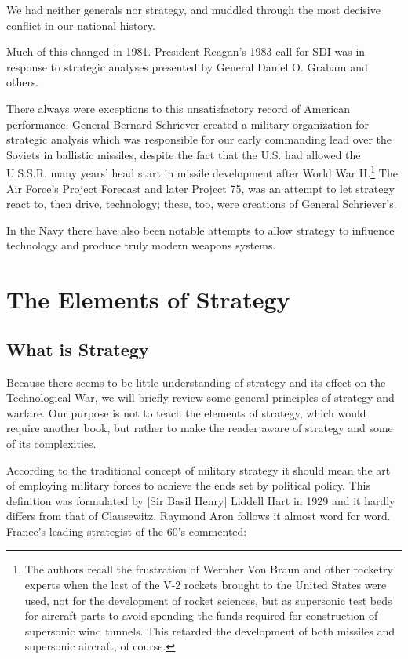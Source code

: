 We had neither generals nor strategy, and muddled through the most decisive conflict in our national history.

Much of this changed in 1981. President Reagan's 1983 call for SDI was in response to strategic analyses presented by General Daniel O. Graham and others.

There always were exceptions to this unsatisfactory record of American performance. General Bernard Schriever created a military organization for strategic analysis which was responsible for our early commanding lead over the Soviets in ballistic missiles, despite the fact that the U.S. had allowed the U.S.S.R. many years' head start in missile development after World War II.\footnote{The authors recall the frustration of Wernher Von Braun and other rocketry experts when the last of the V-2 rockets brought to the United States were used, not for the development of rocket sciences, but as supersonic test beds for aircraft parts to avoid spending the funds required for construction of supersonic wind tunnels. This retarded the development of both missiles and supersonic aircraft, of course.} The Air Force's Project Forecast and later Project 75, was an attempt to let strategy react to, then drive, technology; these, too, were creations of General Schriever's.

In the Navy there have also been notable attempts to allow strategy to influence technology and produce truly modern weapons systems.

\section{The Elements of Strategy}
\subsection{What is Strategy}
Because there seems to be little understanding of strategy and its effect on the Technological War, we will briefly review some general principles of strategy and warfare. Our purpose is not to teach the elements of strategy, which would require another book, but rather to make the reader aware of strategy and some of its complexities.

According to the traditional concept of military strategy it should mean the art of employing military forces to achieve the ends set by political policy. This definition was formulated by [Sir Basil Henry] Liddell Hart in 1929 and it hardly differs from that of Clausewitz. Raymond Aron follows it almost word for word. France's leading strategist of the 60's commented:

